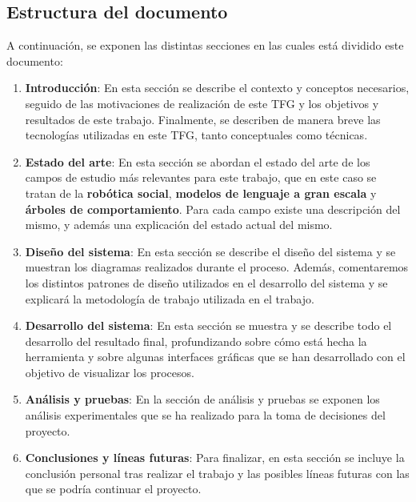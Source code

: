 \documentclass[../main.tex]{subfiles}
\begin{document}
\subsection{Estructura del documento}
A continuación, se exponen las distintas secciones en las cuales está dividido este documento:

\begin{enumerate}
    \item \textbf{Introducción}: En esta sección se describe el contexto y conceptos necesarios, seguido de las motivaciones de realización de este TFG y los objetivos
    y resultados de este trabajo. Finalmente, se describen de manera breve las tecnologías utilizadas en este TFG, tanto conceptuales como técnicas.

    \item \textbf{Estado del arte}: En esta sección se abordan el estado del arte de los campos de estudio más relevantes para este trabajo, que en este caso se tratan de la 
    \textbf{robótica social}, \textbf{modelos de lenguaje a gran escala} y \textbf{árboles de comportamiento}. Para cada campo existe una descripción del mismo, y además una explicación del estado
    actual del mismo.

    \item \textbf{Diseño del sistema}: En esta sección se describe el diseño del sistema y se muestran los diagramas realizados durante el proceso. Además, comentaremos los distintos patrones de diseño utilizados
    en el desarrollo del sistema y se explicará la metodología de trabajo utilizada en el trabajo.

    \item \textbf{Desarrollo del sistema}: En esta sección se muestra y se describe todo el desarrollo del resultado final, profundizando sobre cómo está hecha la herramienta y sobre algunas
    interfaces gráficas que se han desarrollado con el objetivo de visualizar los procesos.

    \item \textbf{Análisis y pruebas}: En la sección de análisis y pruebas se exponen los análisis experimentales que se ha realizado para la toma de decisiones del proyecto.

    \item \textbf{Conclusiones y líneas futuras}: Para finalizar, en esta sección se incluye la conclusión personal tras realizar el trabajo y las posibles líneas futuras con las que
    se podría continuar el proyecto.
\end{enumerate}
\end{document}
